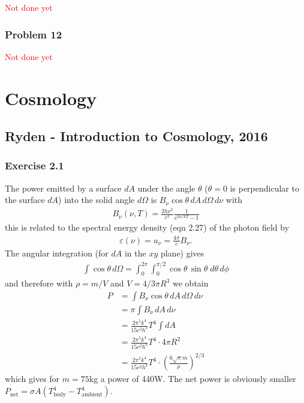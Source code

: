 \documentclass[10pt,a4paper]{article}
\theoremstyle{definition}
\begin{document}
\textcolor{red}{Not done yet}
\subsubsection{Problem 12}
\textcolor{red}{Not done yet}

\section{Cosmology}
\subsection{{\sc Ryden} - Introduction to Cosmology, 2016}
\subsubsection{Exercise 2.1}
The power emitted by a surface $dA$ under the angle $\theta$ ($\theta=0$ is perpendicular to the surface $dA$) into the solid angle $d\Omega$ is $B_\nu\cos\theta\,dA\,d\Omega\,d\nu$ with
\begin{align}
B_\nu(\nu,T)=\frac{2h\nu^3}{c^2}\frac{1}{e^{h\nu/kT}-1}
\end{align}
this is related to the spectral energy density (eqn 2.27) of the photon field by
\begin{align}
\varepsilon(\nu)=u_\nu=\frac{4\pi}{c}B_\nu.
\end{align}
The angular integration (for $dA$ in the $xy$ plane) gives
\begin{align}
\int\cos\theta\,d\Omega=\int_0^{2\pi}\int_0^{\pi/2}\cos\theta\,\sin\theta\;d\theta\,d\phi
\end{align}
and therefore with $\rho=m/V$ and $V=4/3\pi R^3$ we obtain
\begin{align}
P&=\int B_\nu\cos\theta\,dA\,d\Omega\,d\nu\\
&=\pi\int B_\nu\,dA\,d\nu\\
&=\frac{2\pi^5k^4}{15c^2h^3}T^4\int dA\\
&=\frac{2\pi^5k^4}{15c^2h^3}T^4\cdot 4\pi R^2\\
&=\frac{2\pi^5k^4}{15c^2h^3}T^4\cdot \left(\frac{6\sqrt{\pi}m}{\rho}\right)^{2/3}
\end{align}
which gives for $m=75$kg a power of 440W. The net power is obviously smaller $P_\text{net}=\sigma A(T_\text{body}^4-T_\text{ambient}^4)$. 
\end{document}
